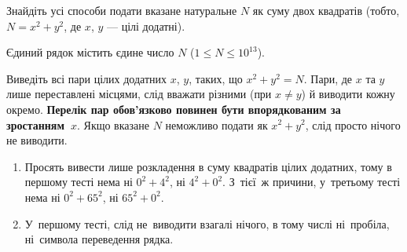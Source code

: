﻿Знайдіть усі способи подати вказане натуральне $N$ як суму двох квадратів (тобто, $N=x^2+y^2$, де $x$, $y$ --- цілі додатні).


\InputFile
Єдиний рядок містить єдине число $N$ ($1\leqslant N\leqslant 10^{13}$).

\OutputFile
Виведіть всі пари цілих додатних $x$, $y$, таких, що $x^2+y^2=N$. Пари, де $x$ та $y$ лише переставлені місцями, слід вважати різними (при $x\neq y$) й виводити кожну окремо. \textbf{Перелік пар обов'язково повинен бути впорядкованим за зростанням~$x$}. 
Якщо вказане $N$ неможливо подати як $x^2+y^2$, слід просто нічого не виводити. 

\Examples

\begin{example}
    
\end{example}

\Note

\begin{enumerate}
\item
 Просять вивести лише розкладення в суму квадратів цілих додатних, тому в першому тесті нема ні $0^2+4^2$, ні $4^2+0^2$. З~тієї~ж причини,
 у~третьому тесті нема ні $0^2+65^2$, ні $65^2+0^2$. 

 \item
У~першому тесті, слід не~виводити взагалі нічого, в тому числі ні~пробіла, ні~символа переведення рядка. 

\end{enumerate}
